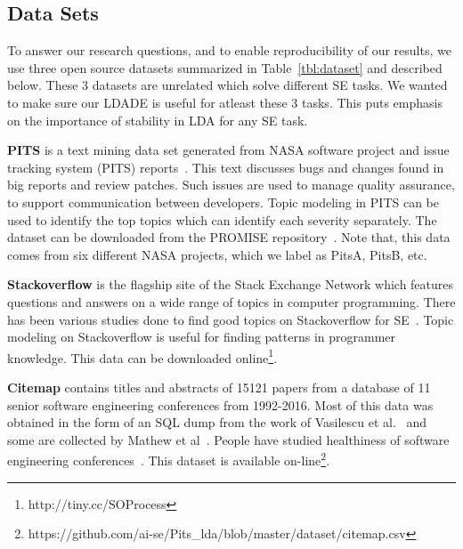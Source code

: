 \documentclass[twocolumn,5p,sort&compress]{elsarticle}
\theoremstyle{break}
\begin{document}
\subsection{Data Sets}
To answer our research questions, and to enable reproducibility of our results,
we use three open source datasets summarized in Table~\ref{tbl:dataset} and described
below. These 3 datasets are unrelated which solve different SE tasks. We wanted to make sure our LDADE is useful for atleast these 3 tasks. This puts emphasis on the importance of stability in LDA for any SE task. 

\textbf{PITS} is a text mining data set generated from NASA software project
and issue tracking system (PITS) reports~\cite{menzies2008improving, menzies2008automated}. This text discusses
bugs and changes found in big reports and  review patches.
Such issues are used
to manage quality assurance, to support communication
between developers. Topic modeling in PITS can be used
to identify the top topics which can
identify each severity separately. The dataset can be downloaded from the
PROMISE
repository~\cite{promiserepo}. Note that, this data comes from six different
NASA projects, which we label as PitsA, PitsB, etc.
    
 \textbf{Stackoverflow} is the flagship site of the Stack Exchange Network which
 features questions and answers on a wide range of topics in computer
 programming. There has been various studies done to find good topics on Stackoverflow for SE~\cite{barua2014developers,linares2013exploratory, allamanis2013and,rosen2016mobile}.
Topic modeling on Stackoverflow is useful for finding patterns in programmer knowledge.
 This data can be downloaded online\footnote{http://tiny.cc/SOProcess}. 
    
  \textbf{Citemap} contains titles and abstracts of 15121 papers from a
 database of 11 senior software engineering conferences from 1992-2016. Most of this data was
 obtained in the form of an SQL dump from the work of Vasilescu et
 al.~\cite{vasilescu2013historical} and some are collected by Mathew et al~\cite{mathew2016trends}. People have studied healthiness of software engineering conferences~\cite{vasilescu2014healthy}. This dataset is available on-line\footnote{https://github.com/ai-se/Pits_lda/blob/master/dataset/citemap.csv}.
\end{document}
